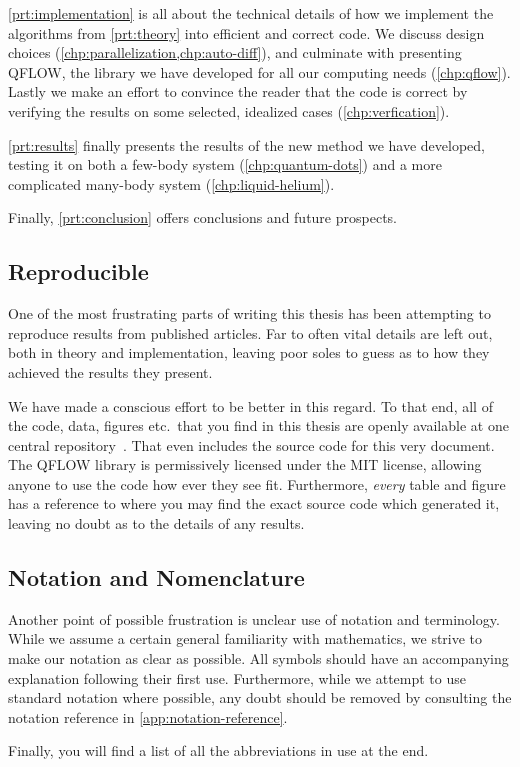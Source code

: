 \documentclass[Thesis.tex]{subfiles}
\begin{document}
\cref{prt:implementation} is all about the technical details of how we implement
the algorithms from \cref{prt:theory} into efficient and correct code. We
discuss design choices (\cref{chp:parallelization,chp:auto-diff}), and culminate
with presenting QFLOW, the library we have
developed for all our computing needs (\cref{chp:qflow}). Lastly we make an effort to convince the
reader that the code is correct by verifying the results on some
selected, idealized cases (\cref{chp:verfication}).

\cref{prt:results} finally presents the results of the new method we have
developed, testing it on both a few-body system (\cref{chp:quantum-dots}) and a
more complicated many-body system (\cref{chp:liquid-helium}).

Finally, \cref{prt:conclusion} offers conclusions and future prospects.

\subsection*{Reproducible}

One of the most frustrating parts of writing this thesis has been attempting to
reproduce results from published articles. Far to often vital details are left
out, both in theory and implementation, leaving poor soles to guess as to how
they achieved the results they present.

We have made a conscious effort to be
better in this regard. To that end, all of the code, data, figures etc.\ that
you find in this thesis are openly available at one central
repository~\cite{qflow}. That even includes the source code for this very
document. The QFLOW library is permissively licensed under the MIT license,
allowing anyone to use the code how ever they see fit. Furthermore, \emph{every} table
and figure has a reference to where you may find the exact source code which
generated it, leaving no doubt as to the details of any results.

\subsection*{Notation and Nomenclature}

Another point of possible frustration is unclear use of notation and terminology. While we
assume a certain general familiarity with mathematics, we strive to make our
notation as clear as possible. All symbols should have an accompanying
explanation following their first use. Furthermore, while we attempt to use
standard notation where possible, any doubt should be removed by consulting the
notation reference in \cref{app:notation-reference}.

Finally, you will find a list of all the abbreviations in use at the end.
\end{document}
